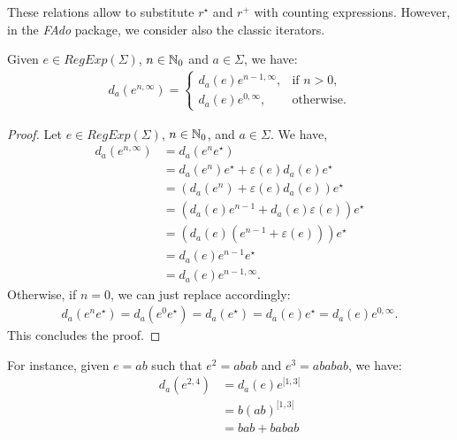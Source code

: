 These relations allow to substitute $r^\star$ and $r^+$ with counting expressions. However, in the \emph{FAdo} package, we consider also the classic iterators.

\begin{thm}
	Given $e \in RegExp(\Sigma)$, $n \in {\mathbb{N}_{0}}$ and $a \in \Sigma$, we have:
	\begin{align*}
		d_a(e^{n,\infty}) =
		\begin{cases}
			d_a(e)e^{n-1, \infty}, & \text{if } n>0, \\
			d_a(e)e^{0, \infty}, & \text{otherwise}.
		\end{cases}
	\end{align*}
\end{thm}
\begin{proof}
	Let $e \in RegExp(\Sigma)$, $n \in {\mathbb{N}_{0}}$, and $a \in \Sigma$. We have,
	\begin{align*}
		d_a(e^{n,\infty}) &= d_a(e^ne^\star) \\
		&= d_a(e^n)e^\star + \varepsilon(e)d_a(e)e^\star \\
		&= (d_a(e^n) + \varepsilon(e)d_a(e))e^\star \\
		&= (d_a(e)e^{n-1} + d_a(e) \varepsilon(e))e^\star \\
		&= (d_a(e)(e^{n-1} + \varepsilon(e)))e^\star \\
		&= d_a(e)e^{n-1}e^\star \\
		&= d_a(e)e^{n-1, \infty}.
	\end{align*}
	Otherwise, if $n=0$, we can just replace accordingly:
	\begin{align*}
		d_a(e^ne^\star) = d_a(e^0e^\star) = d_a(e^\star) = d_a(e)e^\star = d_a(e)e^{0, \infty}.
	\end{align*}
	This concludes the proof.
\end{proof}
For instance, given $e = ab$ such that $e^2 = abab$ and $e^3 = ababab$, we have:
\begin{align*}
	d_a(e^{2,4}) &= d_a(e)e^{[1,3[} \\
	&= b(ab)^{[1,3[} \\
	&= bab + babab
\end{align*}
